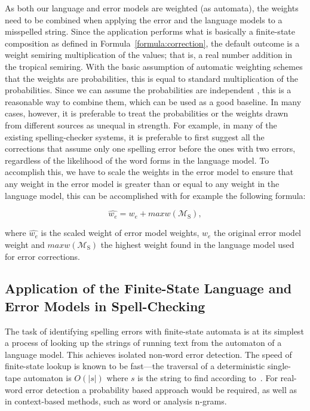 \documentclass[a4paper,12pt]{article}
\begin{document}
As both our language and error models are weighted (as automata), the
weights need to be combined when applying the error and the language models to
a misspelled string. Since the application performs what is basically a
finite-state composition as defined in Formula~\ref{formula:correction}, the
default outcome is a weight semiring multiplication of the values; that is, a
real number addition in the tropical semiring. With the basic assumption of
automatic weighting schemes that the weights are probabilities, this is equal
to standard multiplication of the probabilities. Since we can assume the
probabilities are independent \cite[]{church1991probability}, this is a
reasonable way to combine them, which can be used as a good baseline. In many
cases, however, it is preferable to treat the probabilities or the weights
drawn from different sources as unequal in strength. For example, in many of the
existing spelling-checker systems, it is preferable to first suggest all the
corrections that assume only one spelling error before the ones with two
errors, regardless of the likelihood of the word forms in the language model.
To accomplish this, we have to scale the weights in the error model to ensure
that any weight in the error model is greater than or equal to any weight in
the language model, this can be accomplished with for example the following
formula:

\begin{equation}
    \hat{w_e} = w_e + maxw(\mathcal{M}_\mathrm{S}),
\end{equation}

where $\hat{w_e}$ is the scaled weight of error model weights, $w_e$ the original
error model weight and $maxw(\mathcal{M}_\mathrm{S})$ the highest weight found in
the language model used for error corrections.

\subsection{Application of the Finite-State Language and Error Models in
Spell-Checking}

The task of identifying spelling errors with finite-state automata is at its
simplest a process of looking up the strings of running text from the automaton
of a language model. This achieves isolated non-word error detection. The
speed of finite-state lookup is known to be fast---the traversal of a
deterministic single-tape automaton is $O(|s|)$ where $s$ is the string to find
according to~\cite{aho2007compilers}. For real-word error detection a
probability based approach would be required, as well as in context-based
methods, such as word or analysis n-grams.
\end{document}
